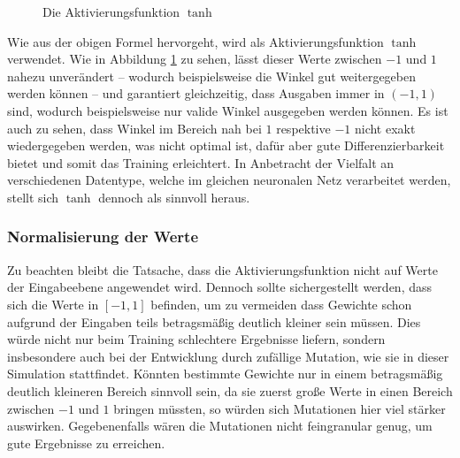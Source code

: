 \documentclass[course=erap]{aspdoc}
\begin{document}
\begin{figure}
    \centering
    \caption{Die Aktivierungsfunktion $\tanh$}
    \label{fig:tanh}
\end{figure}

Wie aus der obigen Formel hervorgeht, wird als Aktivierungsfunktion $\tanh$ verwendet. Wie in Abbildung \ref{fig:tanh} zu sehen, lässt dieser Werte zwischen $-1$ und $1$ nahezu unverändert -- wodurch beispielsweise die Winkel gut weitergegeben werden können -- und garantiert gleichzeitig, dass Ausgaben immer in $(-1,1)$ sind, wodurch beispielsweise nur valide Winkel ausgegeben werden können. Es ist auch zu sehen, dass Winkel im Bereich nah bei $1$ respektive $-1$ nicht exakt wiedergegeben werden, was nicht optimal ist, dafür aber gute Differenzierbarkeit bietet und somit das Training erleichtert. In Anbetracht der Vielfalt an verschiedenen Datentype, welche im gleichen neuronalen Netz verarbeitet werden, stellt sich $\tanh$ dennoch als sinnvoll heraus.

\subsubsection{Normalisierung der Werte}

Zu beachten bleibt die Tatsache, dass die Aktivierungsfunktion nicht auf Werte der Eingabeebene angewendet wird. Dennoch sollte sichergestellt werden, dass sich die Werte in $[-1,1]$ befinden, um zu vermeiden dass Gewichte schon aufgrund der Eingaben teils betragsmäßig deutlich kleiner sein müssen. Dies würde nicht nur beim Training schlechtere Ergebnisse liefern, sondern insbesondere auch bei der Entwicklung durch zufällige Mutation, wie sie in dieser Simulation stattfindet. Könnten bestimmte Gewichte nur in einem betragsmäßig deutlich kleineren Bereich sinnvoll sein, da sie zuerst große Werte in einen Bereich zwischen $-1$ und $1$ bringen müssten, so würden sich Mutationen hier viel stärker auswirken. Gegebenenfalls wären die Mutationen nicht feingranular genug, um gute Ergebnisse zu erreichen.
\end{document}
